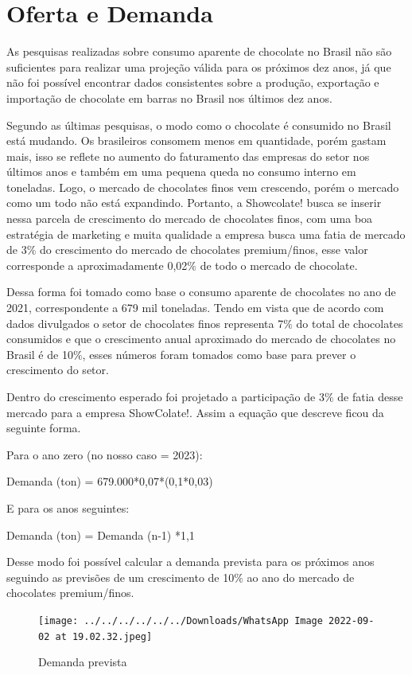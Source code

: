\documentclass[
	12pt,				%
	openright,			%
	oneside,			%
	a4paper,			%
	english,			%
	french,				%
	spanish,			%
	brazil				%
	]{abntex2}
\begin{document}
\newpage
\chapter{Oferta e Demanda}

As pesquisas realizadas sobre consumo aparente de chocolate no Brasil não são suficientes para realizar uma projeção válida para os próximos dez anos, já que não foi possível encontrar dados consistentes sobre a produção, exportação e importação de chocolate em barras no Brasil nos últimos dez anos.

Segundo as últimas pesquisas, o modo como o chocolate é consumido no Brasil está mudando. Os brasileiros consomem menos em quantidade, porém gastam mais, isso se reflete no aumento do faturamento das empresas do setor nos últimos anos e também em uma pequena queda no consumo interno em toneladas. Logo, o mercado de chocolates finos vem crescendo, porém o mercado como um todo não está expandindo. Portanto, a Showcolate! busca se inserir nessa parcela de crescimento do mercado de chocolates finos, com uma boa estratégia de marketing e muita qualidade a empresa busca uma fatia de mercado de 3$\%$ do crescimento do mercado de chocolates premium/finos, esse valor corresponde a aproximadamente 0,02$\%$ de todo o mercado de chocolate.

Dessa forma foi tomado como base o consumo aparente de chocolates no ano de 2021, correspondente a 679 mil toneladas. Tendo em vista que de acordo com dados divulgados o setor de chocolates finos representa 7$\%$ do total de chocolates consumidos e que o crescimento anual aproximado do mercado de chocolates no Brasil é de 10$\%$, esses números foram tomados como base para prever o crescimento do setor. \cite{c2-1} \cite{c2-2} \cite{4}

Dentro do crescimento esperado foi projetado a participação de 3$\%$ de fatia desse mercado para a empresa ShowColate!. Assim a equação que descreve ficou da seguinte forma.

Para o ano zero (no nosso caso = 2023):

Demanda (ton) = 679.000*0,07*(0,1*0,03)

E para os anos seguintes:

Demanda (ton) = Demanda (n-1) *1,1

Desse modo foi possível calcular a demanda prevista para os próximos anos seguindo as previsões de um crescimento de 10$\%$ ao ano do mercado de chocolates premium/finos.

\begin{figure}[H]
\begin{center}
\caption{Demanda prevista}
\texttt{[image: ../../../../../../Downloads/WhatsApp Image 2022-09-02 at 19.02.32.jpeg]} 
\end{center}
\end{figure}
\end{document}
